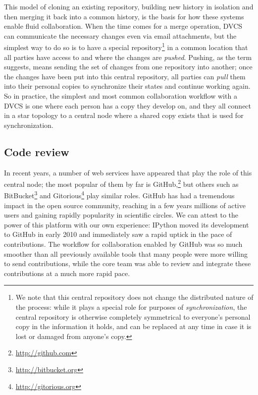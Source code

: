 \documentclass[11pt,oneside,english]{article}
\begin{document}
This model of cloning an existing repository, building new history in isolation
and then merging it back into a common history, is the basis for how these
systems enable fluid collaboration.  When the time comes for
a merge operation, DVCS can communicate the necessary changes even
via email attachments, but the simplest way to do so is to have a special
repository\footnote{We note that this central repository does not change the
  distributed nature of the process: while it plays a special role for purposes
  of \emph{synchronization}, the central repository is otherwise completely
  symmetrical to everyone's personal copy in the information it holds, and can
  be replaced at any time in case it is lost or damaged from anyone's copy.} in
a common location that all parties have access to and where the changes are
\emph{pushed}.  Pushing, as the term suggests, means sending the set of
changes from one repository into another; once the changes have been put into
this central repository, all parties can \emph{pull} them into their personal
copies to synchronize their states and continue working again.  So in practice,
the simplest and most common collaboration workflow with a DVCS is one where
each person has a copy they develop on, and they all connect in a star topology
to a central node where a shared copy exists that is used for synchronization.

\subsection{Code review}\label{subsec:code_review}

In recent years, a number of web services have appeared that play the role of
this central node; the most popular of them by far is
GitHub,\footnote{\url{http://github.com}} but others such as
BitBucket\footnote{\url{http://bitbucket.org}} and
Gitorious\footnote{\url{http://gitorious.org}} play similar roles.  GitHub has
had a tremendous impact in the open source community, reaching in a few years
millions of active users and gaining rapidly popularity in scientific circles.
We can attest to the power of this platform with our own experience:
IPython moved its development to GitHub in early 2010 and
immediately saw a rapid uptick in the pace of contributions.  The workflow for
collaboration enabled by GitHub was so much smoother than all previously
available tools that many people were more willing to send contributions, while
the core team was able to review and integrate these contributions at a much
more rapid pace.
\end{document}
